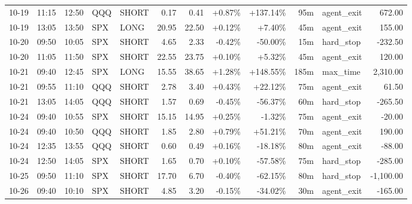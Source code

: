 \documentclass[11pt,a4paper,twoside]{article}
\begin{document}
\begin{center}
\begin{longtable}{>{\color{txtmain}}l l l l l r r r r r >{\color{txtmain}}l r}
10-19 & 11:15 & 12:50 & QQQ & SHORT & 0.17 & 0.41 & \textcolor{wingreen}{+0.87\%} & \textcolor{wingreen}{+137.14\%} & 95m & agent\_exit & \textcolor{wingreen}{672.00} \\
10-19 & 13:05 & 13:50 & SPX & LONG & 20.95 & 22.50 & \textcolor{wingreen}{+0.12\%} & \textcolor{wingreen}{+7.40\%} & 45m & agent\_exit & \textcolor{wingreen}{155.00} \\
10-20 & 09:50 & 10:05 & SPX & SHORT & 4.65 & 2.33 & \textcolor{lossred}{-0.42\%} & \textcolor{lossred}{-50.00\%} & 15m & hard\_stop & \textcolor{lossred}{-232.50} \\
10-20 & 11:05 & 11:50 & SPX & SHORT & 22.55 & 23.75 & \textcolor{wingreen}{+0.10\%} & \textcolor{wingreen}{+5.32\%} & 45m & agent\_exit & \textcolor{wingreen}{120.00} \\
10-21 & 09:40 & 12:45 & SPX & LONG & 15.55 & 38.65 & \textcolor{wingreen}{+1.28\%} & \textcolor{wingreen}{+148.55\%} & 185m & max\_time & \textcolor{wingreen}{2,310.00} \\
10-21 & 09:55 & 11:10 & QQQ & SHORT & 2.78 & 3.40 & \textcolor{wingreen}{+0.43\%} & \textcolor{wingreen}{+22.12\%} & 75m & agent\_exit & \textcolor{wingreen}{61.50} \\
10-21 & 13:05 & 14:05 & QQQ & SHORT & 1.57 & 0.69 & \textcolor{lossred}{-0.45\%} & \textcolor{lossred}{-56.37\%} & 60m & hard\_stop & \textcolor{lossred}{-265.50} \\
10-24 & 09:40 & 10:55 & SPX & SHORT & 15.15 & 14.95 & \textcolor{wingreen}{+0.25\%} & \textcolor{lossred}{-1.32\%} & 75m & agent\_exit & \textcolor{lossred}{-20.00} \\
10-24 & 09:40 & 10:50 & QQQ & SHORT & 1.85 & 2.80 & \textcolor{wingreen}{+0.79\%} & \textcolor{wingreen}{+51.21\%} & 70m & agent\_exit & \textcolor{wingreen}{190.00} \\
10-24 & 12:35 & 13:55 & QQQ & SHORT & 0.60 & 0.49 & \textcolor{wingreen}{+0.16\%} & \textcolor{lossred}{-18.18\%} & 80m & agent\_exit & \textcolor{lossred}{-88.00} \\
10-24 & 12:50 & 14:05 & SPX & SHORT & 1.65 & 0.70 & \textcolor{wingreen}{+0.10\%} & \textcolor{lossred}{-57.58\%} & 75m & hard\_stop & \textcolor{lossred}{-285.00} \\
10-25 & 09:50 & 11:10 & SPX & SHORT & 17.70 & 6.70 & \textcolor{lossred}{-0.40\%} & \textcolor{lossred}{-62.15\%} & 80m & hard\_stop & \textcolor{lossred}{-1,100.00} \\
10-26 & 09:40 & 10:10 & SPX & SHORT & 4.85 & 3.20 & \textcolor{lossred}{-0.15\%} & \textcolor{lossred}{-34.02\%} & 30m & agent\_exit & \textcolor{lossred}{-165.00} \\

\end{longtable}
\end{center}
\end{document}
